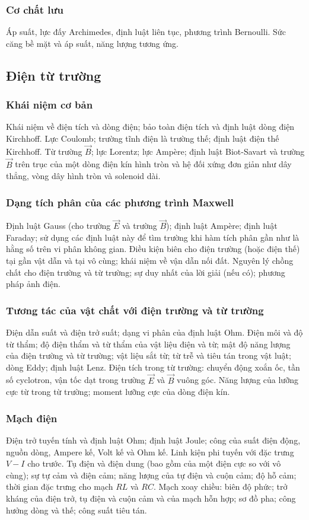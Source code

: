 \documentclass{article}
\begin{document}
\begin{multicols}{2}
\subsubsection{Cơ chất lưu}
Áp suất, lực đấy Archimedes, định luật liên tục, phương trình Bernoulli. Sức căng bề mặt và áp suất, năng lượng tương ứng.

\subsection{Điện từ trường}
\subsubsection{Khái niệm cơ bản}
Khái niệm về điện tích và dòng điện; bảo toàn điện tích và định luật dòng điện Kirchhoff. Lực Coulomb; trường tĩnh điện là trường thế; định luật điện thế Kirchhoff. Từ trường $\vec{B}$; lực Lorentz; lực Ampère; định luật Biot-Savart và trường $\vec{B}$ trên trục của một dòng điện kín hình tròn và hệ đối xứng đơn giản như dây thẳng, vòng dây hình tròn và solenoid dài.

\subsubsection{Dạng tích phân của các phương trình Maxwell}
Định luật Gauss (cho trường $\vec{E}$ và trường $\vec{B}$); định luật Ampère; định luật Faraday; sử dụng các định luật này để tìm trường khi hàm tích phân gần như là hằng số trên vi phân không gian. Điều kiện biên cho điện trường (hoặc điện thế) tại gần vật dẫn và tại vô cùng; khái niệm về vận dẫn nối đất. Nguyên lý chồng chất cho điện trường và từ trường; sự duy nhất của lời giải (nếu có); phương pháp ảnh điện.

\subsubsection{Tương tác của vật chất với điện trường và từ trường}
Điện dẫn suất và điện trở suất; dạng vi phân của định luật Ohm. Điện môi và độ từ thẩm; độ điện thẩm và từ thẩm của vật liệu điện và từ; mật độ năng lượng của điện trường và từ trường; vật liệu sắt từ; từ trễ và tiêu tán trong vật luật; dòng Eddy; định luật Lenz. Điện tích trong từ trường: chuyển động xoắn ốc, tần số cyclotron, vận tốc dạt trong trường $\vec{E}$ và $\vec{B}$ vuông góc. Năng lượng của lưỡng cực từ trong từ trường; moment lưỡng cực của dòng điện kín.

\subsubsection{Mạch điện}
Điện trở tuyến tính và định luật Ohm; định luật Joule; công của suất điện động, nguồn dòng, Ampere kế, Volt kế và Ohm kế. Linh kiện phi tuyến với đặc trưng $V-I$ cho trước. Tụ điện và điện dung (bao gồm của một điện cực so với vô cùng); sự tự cảm và điện cảm; năng lượng của tự điện và cuộn cảm; độ hỗ cảm; thời gian đặc trưng cho mạch $RL$ và $RC$. Mạch xoay chiều: biên độ phức; trở kháng của điện trở, tụ điện và cuộn cảm và của mạch hỗn hợp; sơ đồ pha; công hưởng dòng và thế; công suất tiêu tán.


\end{multicols}
\end{document}
